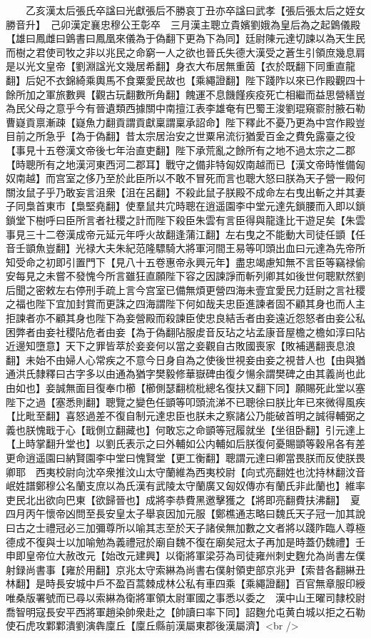 　　乙亥漢太后張氏卒諡曰光獻張后不勝哀丁丑亦卒諡曰武孝【張后張太后之姪女勝音升】　己卯漢定襄忠穆公王彰卒　三月漢主聰立貴嬪劉娥為皇后為之起䳨儀殿【雄曰鳳雌曰䳨書曰鳳凰來儀為于偽翻下更為下為同】廷尉陳元達切諫以為天生民而樹之君使司牧之非以兆民之命窮一人之欲也晉氏失德大漢受之蒼生引領庶幾息肩是以光文皇帝【劉淵諡光文幾居希翻】身衣大布居無重茵【衣於既翻下同重直龍翻】后妃不衣錦綺乘輿馬不食粟愛民故也【乘繩證翻】陛下踐阼以來已作殿觀四十餘所加之軍旅數興【觀古玩翻數所角翻】餽運不息饑饉疾疫死亡相繼而益思營繕豈為民父母之意乎今有晉遺類西據關中南擅江表李雄奄有巴蜀王浚劉琨窺窬肘腋石勒曹嶷貢禀漸疎【嶷魚力翻貢謂貢獻稟謂稟承詔命】陛下釋此不憂乃更為中宫作殿豈目前之所急乎【為于偽翻】昔太宗居治安之世粟帛流衍猶愛百金之費免露臺之役【事見十五卷漢文帝後七年治直吏翻】陛下承荒亂之餘所有之地不過太宗之二郡【時聰所有之地漢河東西河二郡耳】戰守之備非特匈奴南越而已【漢文帝時惟備匈奴南越】而宫室之侈乃至於此臣所以不敢不冒死而言也聰大怒曰朕為天子營一殿何關汝鼠子乎乃敢妄言沮衆【沮在呂翻】不殺此鼠子朕殿不成命左右曳出斬之并其妻子同梟首東市【梟堅堯翻】使羣鼠共宂時聰在逍遥園李中堂元達先鎖腰而入即以鎖鎖堂下樹呼曰臣所言者社稷之計而陛下殺臣朱雲有言臣得與龍逢比干遊足矣【朱雲事見三十二卷漢成帝元延元年呼火故翻逢蒲江翻】左右曳之不能動大司徒任顗【任音壬顗魚豈翻】光禄大夫朱紀范隆驃騎大將軍河間王易等叩頭出血曰元達為先帝所知受命之初即引置門下【見八十五卷惠帝永興元年】盡忠竭慮知無不言臣等竊禄偷安每見之未嘗不發愧今所言雖狂直願陛下容之因諫諍而斬列卿其如後世何聰默然劉后聞之密敕左右停刑手疏上言今宫室已備無煩更營四海未壹宜愛民力廷尉之言社稷之福也陛下宜加封賞而更誅之四海謂陛下何如哉夫忠臣進諫者固不顧其身也而人主拒諫者亦不顧其身也陛下為妾營殿而殺諫臣使忠良結舌者由妾遠近怨怒者由妾公私困弊者由妾社稷阽危者由妾【為于偽翻阽服䖍音反玷之坫孟康音屋檐之檐如淳曰阽近邊知墮意】天下之罪皆萃於妾妾何以當之妾觀自古敗國喪家【敗補邁翻喪息浪翻】未始不由婦人心常疾之不意今日身自為之使後世視妾由妾之視昔人也【由與猶通洪氏隸釋曰古字多以由通為猶字樊毅修華嶽碑由復夕愓余謂樊碑之由其義尚也此由如也】妾誠無面目復奉巾櫛【櫛側瑟翻梳枇總名復扶又翻下同】願賜死此堂以塞陛下之過【塞悉則翻】聰覽之變色任顗等叩頭流涕不已聰徐曰朕比年已來微得風疾【比毗至翻】喜怒過差不復自制元達忠臣也朕未之察諸公乃能破首明之誠得輔弼之義也朕愧戢于心【戢側立翻藏也】何敢忘之命顗等冠履就坐【坐徂卧翻】引元達上【上時掌翻升堂也】以劉氏表示之曰外輔如公内輔如后朕復何憂賜顗等穀帛各有差更命逍遥園曰納賢園李中堂曰愧賢堂【更工衡翻】聰謂元達曰卿當畏朕而反使朕畏卿耶　西夷校尉向沈卒衆推汶山太守蘭維為西夷校尉【向式亮翻姓也沈持林翻汶音岷姓譜鄭穆公名蘭支庶以為氏漢有武陵太守蘭廣又匈奴傳亦有蘭氏非此蘭也】維率吏民北出欲向巴東【欲歸晉也】成將李恭費黑邀擊獲之【將即亮翻費扶沸翻】　夏四月丙午懷帝凶問至長安皇太子舉哀因加元服【鄭樵通志略曰魏氏天子冠一加其說曰古之士禮冠必三加彌尊所以喻其志至於天子諸侯無加數之文者將以踐阼臨人尊極德成不復與士以加喻勉為義禮冠於廟自魏不復在廟矣冠太子再加是時蓋仍魏禮】壬申即皇帝位大赦改元【始改元建興】以衛將軍梁芬為司徒雍州刺史麴允為尚書左僕射録尚書事【雍於用翻】京兆太守索綝為尚書右僕射領吏部京兆尹【索昔各翻綝丑林翻】是時長安城中戶不盈百蒿棘成林公私有車四乘【乘繩證翻】百官無章服印綬唯桑版署號而已尋以索綝為衛將軍領太尉軍國之事悉以委之　漢中山王曜司隸校尉喬智明寇長安平西將軍趙染帥衆赴之【帥讀曰率下同】詔麴允屯黄白城以拒之石勒使石虎攻鄴鄴潰劉演犇廩丘【廩丘縣前漢屬東郡後漢屬濟】<br />
